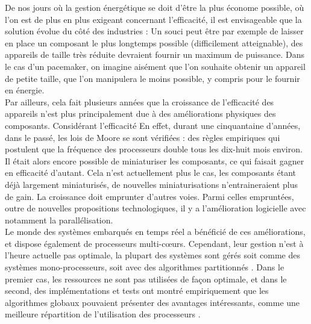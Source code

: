 \documentclass[11pt,a4paper,oneside]{report}
\begin{document}
De nos jours où la gestion énergétique se doit d'être la plus 
économe possible, 
où l'on est de plus en plus exigeant concernant l'efficacité, 
il est envisageable que la solution évolue du côté des industries : 
Un souci peut être par exemple de laisser en place un composant le plus 
longtemps possible (difficilement atteignable), des appareils de taille très réduite 
devraient fournir un maximum de puissance. 
Dans le cas d'un pacemaker, on imagine aisément que l'on souhaite obtenir un appareil 
de petite taille, que l'on manipulera le moins possible, y compris pour le fournir en 
énergie. \\

Par ailleurs, cela fait plusieurs années que la croissance de l'efficacité des appareils n'est plus 
principalement due à des améliorations physiques des composants. 
Considérant l'efficacité 
En effet, durant une cinquantaine d'années, dans le passé, les lois de Moore %
se sont vérifiées : des règles empiriques qui postulent que la fréquence des processeurs 
double tous les dix-huit mois environ. 
Il était alors encore possible de miniaturiser les composants, 
ce qui faisait gagner en efficacité d'autant. 
Cela n'est actuellement plus le cas, 
les composants étant déjà largement miniaturisés, de nouvelles miniaturisations 
n'entraineraient plus de gain. La croissance doit emprunter d'autres voies. Parmi celles 
empruntées, outre de nouvelles propositions technologiques, 
il y a l'amélioration logicielle avec notamment la parallélisation.
\\

Le monde des systèmes embarqués en temps réel a bénéficié de ces améliorations, 
et dispose également de processeurs multi-c\oe{}urs. Cependant, leur gestion n'est 
à l'heure actuelle pas optimale, la plupart des systèmes sont  
gérés soit comme des systèmes mono-processeurs, soit avec des algorithmes partitionnés \cite{paolillo_new_nodate}. 
Dans le premier cas, les ressources ne sont pas utilisées de façon optimale, 
et dans le second, des implémentations et tests ont montré empiriquement 
que les algorithmes globaux pouvaient présenter des avantages intéressants, comme 
une meilleure répartition de l'utilisation des processeurs \cite{baker_analysis_2005}. 
\\ 
\end{document}
